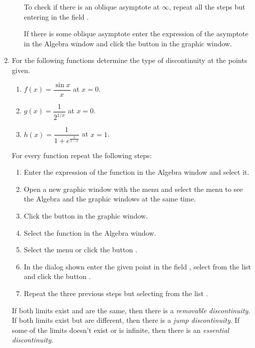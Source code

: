 \begin{enumerate}[leftmargin=*]
\begin{enumerate}
\begin{indication}
To check if there is an oblique asymptote at $\infty$, repeat all the steps but entering  in the field .
 
If there is some oblique asymptote enter the expression of the asymptote in the Algebra window and click the button  in the graphic window.
\end{indication}
\end{enumerate}

\item For the following functions determine the type of discontinuity at the points given.
\begin{enumerate}
\item $f(x)=\dfrac{\sin x}{x}$ at $x=0$.
\item $g(x)=\dfrac{1}{2^{1/x}}$ at $x=0$.
\item $h(x)=\dfrac{1}{1+e^{\frac{1}{1-x}}}$ at $x=1$.
\end{enumerate}

\begin{indication}
For every function repeat the following steps:
\begin{enumerate}
\item Enter the expression of the function in the Algebra window and select it.
\item Open a new graphic window with the menu  and select the menu  to see the Algebra and the graphic windows at the same time.  
\item Click the button  in the graphic window.
\item Select the function in the Algebra window.
\item Select the menu  or click the button .
\item In the dialog shown enter the given point in the field , select  from the list  and click the button . 
\item Repeat the three previous steps but selecting  from the list .
\end{enumerate}
If both limits exist and are the same, then there is a \emph{removable discontinuity}. 
If both limits exist but are different, then there is a \emph{jump discontinuity}.
If some of the limits doesn't exist or is infinite, then there is an \emph{essential discontinuity}.  
\end{indication}



\end{enumerate}
